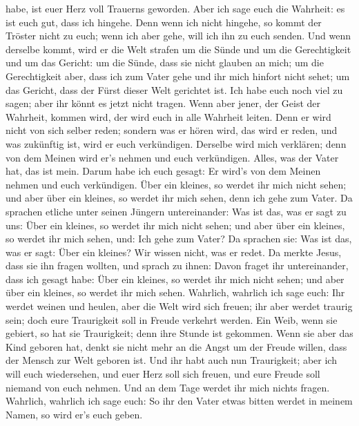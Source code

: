 habe, ist euer Herz voll Trauerns geworden.  Aber ich sage
euch die Wahrheit: es ist euch gut, dass ich hingehe. Denn wenn ich
nicht hingehe, so kommt der Tröster nicht zu euch; wenn ich aber gehe,
will ich ihn zu euch senden.  Und wenn derselbe kommt, wird
er die Welt strafen um die Sünde und um die Gerechtigkeit und um das
Gericht:  um die Sünde, dass sie nicht glauben an mich;
 um die Gerechtigkeit aber, dass ich zum Vater gehe und ihr
mich hinfort nicht sehet;  um das Gericht, dass der Fürst
dieser Welt gerichtet ist.  Ich habe euch noch viel zu
sagen; aber ihr könnt es jetzt nicht tragen.  Wenn aber
jener, der Geist der Wahrheit, kommen wird, der wird euch in alle
Wahrheit leiten. Denn er wird nicht von sich selber reden; sondern was
er hören wird, das wird er reden, und was zukünftig ist, wird er euch
verkündigen.  Derselbe wird mich verklären; denn von dem
Meinen wird er's nehmen und euch verkündigen.  Alles, was
der Vater hat, das ist mein. Darum habe ich euch gesagt: Er wird's von
dem Meinen nehmen und euch verkündigen.  Über ein kleines,
so werdet ihr mich nicht sehen; und aber über ein kleines, so werdet ihr
mich sehen, denn ich gehe zum Vater.  Da sprachen etliche
unter seinen Jüngern untereinander: Was ist das, was er sagt zu uns:
Über ein kleines, so werdet ihr mich nicht sehen; und aber über ein
kleines, so werdet ihr mich sehen, und: Ich gehe zum Vater?
 Da sprachen sie: Was ist das, was er sagt: Über ein
kleines? Wir wissen nicht, was er redet.  Da merkte Jesus,
dass sie ihn fragen wollten, und sprach zu ihnen: Davon fraget ihr
untereinander, dass ich gesagt habe: Über ein kleines, so werdet ihr
mich nicht sehen; und aber über ein kleines, so werdet ihr mich sehen.
 Wahrlich, wahrlich ich sage euch: Ihr werdet weinen und
heulen, aber die Welt wird sich freuen; ihr aber werdet traurig sein;
doch eure Traurigkeit soll in Freude verkehrt werden.  Ein
Weib, wenn sie gebiert, so hat sie Traurigkeit; denn ihre Stunde ist
gekommen. Wenn sie aber das Kind geboren hat, denkt sie nicht mehr an
die Angst um der Freude willen, dass der Mensch zur Welt geboren ist.
 Und ihr habt auch nun Traurigkeit; aber ich will euch
wiedersehen, und euer Herz soll sich freuen, und eure Freude soll
niemand von euch nehmen.  Und an dem Tage werdet ihr mich
nichts fragen. Wahrlich, wahrlich ich sage euch: So ihr den Vater etwas
bitten werdet in meinem Namen, so wird er's euch geben. 
